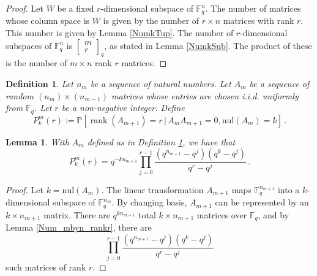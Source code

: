 \documentclass[3p,times]{elsarticle}
\newtheorem{lemma}[theorem]{Lemma}
\newtheorem{definition}[theorem]{Definition}
\theoremstyle{remark}
\DeclareMathOperator{\rank}{\mathrm{rank}}
\newcommand{\Fq}{\mathbb{F}_q}
\newcommand\Fqn[1]{\mathbb{F}_q^{#1}}
\newcommand{\nul}{\mathrm{nul}}
\newcommand{\st}{\,|\,} %
\begin{document}
\begin{proof}
  Let $W$ be a fixed $r$-dimensional subspace of $\Fqn{n}$.  The number of
  matrices whose column space is $W$ is given by the number of $r\times n$
  matrices with rank $r$.  This number is given by Lemma \ref{NumkTup}. The
  number of $r$-dimensional subspaces of $\Fqn{n}$ is
  $\left[\begin{smallmatrix}m\\r\end{smallmatrix}\right]_q$,  as stated in
  Lemma \ref{NumkSub}.  The product of these is the number of $m\times n$
  rank $r$ matrices.
\end{proof}

\begin{definition}\label{defPkmr}
Let $n_m$ be a sequence of natural numbers. Let $A_m$ be a sequence of random
$(n_m) \times (n_{m-1})$ matrices whose entries are chosen i.i.d. uniformly
from $\Fq$. Let $r$ be a non-negative integer.  Define 
\[
  P^m_k(r) := \mathbb{P} 
  \left[\rank(A_{m+1}) = r \st A_{m}A_{m+1} = 0, \nul(A_{m}) = k \right] \, .
\]
\end{definition}


\begin{lemma}\label{lemPkmr} With $A_m$ defined as in Definition \ref{defPkmr}, we have that
  \begin{equation}
    P^m_k(r) = 
    q^{-kn_{m+1}}\prod_{j=0}^{r-1} \frac{(q^{n_{m+1}}-q^j) (q^k - q^j)}{q^r - q^j} \, . %
	 \label{eqn:Pmkr}
       \end{equation}
\end{lemma}
\begin{proof}
  Let $ k = \nul(A_m)$.
The linear transformation $A_{m+1}$ maps 
$\Fq^{n_{m+1}}$ into a $k$-dimensional subspace of
$\Fq^{n_{m}}$. By changing basis, $A_{m+1}$ can be represented by an
$k \times n_{m+1}$ matrix. There are $q^{kn_{m+1}}$ total $k \times n_{m+1}$
matrices over $\Fqn{}$, and by
Lemma \ref{Num_mbyn_rankr}, there are 
\[
  \prod_{j=0}^{r-1} \frac{(q^{n_{m+1}}-q^j) ( q^k - q^j)}{q^r-q^j}
\]
such matrices of rank $r$.
\end{proof}
\end{document}
